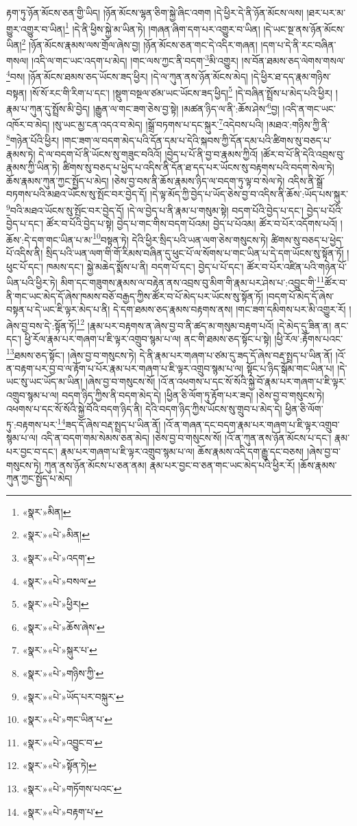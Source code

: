 རྟག་ཏུ་ཉོན་མོངས་ཅན་གྱི་ཡིད། །ཉོན་མོངས་ལྷན་ཅིག་སྐྱེ་ཞིང་འགག །དེ་ཕྱིར་དེ་ནི་ཉོན་མོངས་ལས། །ཐར་པར་མ་གྱུར་འགྱུར་བ་ཡིན།\footnote{«སྣར་»མིན།} །དེ་ནི་ཕྱིས་སྐྱེ་མ་ཡིན་ཏེ། །གཞན་ཞིག་དག་པར་འགྱུར་བ་ཡིན། །དེ་ཡང་སྔ་ནས་ཉོན་མོངས་ཡིན།\footnote{«སྣར་»«པེ་»མིན།} །ཉོན་མོངས་རྣམས་ལས་གྲོལ་ཞེས་བྱ། །ཉོན་མོངས་ཅན་གང་དེ་འདིར་གཞན། །དག་པ་དེ་ནི་རང་བཞིན་གསལ། །འདི་ལ་གང་ཡང་འདག་པ་མེད། །གང་ལས་ཀྱང་ནི་བདག་\footnote{«སྣར་»«པེ་»འདག་}མི་འགྱུར། །ས་བོན་ཐམས་ཅད་ལེགས་གསལ་\footnote{«སྣར་»«པེ་»བསལ་}བས། །ཉོན་མོངས་ཐམས་ཅད་ཡོངས་ཟད་ཕྱིར། །དེ་ལ་ཀུན་ནས་ཉོན་མོངས་མེད། །དེ་ཕྱིར་ཐ་དད་རྣམ་གཉིས་བསྟན། །སོ་སོ་རང་གི་རིག་པ་དང་། །སྡུག་བསྔལ་ཙམ་ཡང་ཡོངས་ཟད་ཕྱིད།\footnote{«སྣར་»«པེ་»ཕྱིར།} །དེ་བཞིན་སྤྲོས་པ་མེད་པའི་ཕྱིར། །རྣམ་པ་ཀུན་དུ་སྤྲོས་མི་བྱེད། །རྒྱུན་ལ་གང་ཟག་ཅེས་བྱ་སྟེ། །མཚན་ཉིད་ལ་ནི་:ཆོས་ཤེས་\footnote{«སྣར་»«པེ་»ཆོས་ཞེས་}བྱ། །འདི་ན་གང་ཡང་འཁོར་བ་མེད། །སུ་ཡང་མྱ་ངན་འདའ་བ་མེད། །སྒྲོ་བཏགས་པ་དང་སྐུར་\footnote{«སྣར་»«པེ་»སྐུར་པ་}འདེབས་པའི། །མཐའ་:གཉིས་ཀྱི་ནི་\footnote{«སྣར་»«པེ་»གཉིས་ཀྱི་}གཉེན་པོའི་ཕྱིར། །གང་ཟག་ལ་བདག་མེད་པའི་དོན་དམ་པ་དེའི་སྐབས་ཀྱི་དོན་དམ་པའི་ཚིགས་སུ་བཅད་པ་རྣམས་ཏེ། དེ་ལ་བདག་པོ་ནི་ཡོངས་སུ་གཟུང་བའིའོ། །བྱེད་པ་པོ་ནི་བྱ་བ་རྣམས་ཀྱིའོ། །ཚོར་བ་པོ་ནི་དེའི་འབྲས་བུ་རྣམས་ཀྱི་ཡིན་ཏེ། ཚིགས་སུ་བཅད་པ་ཕྱེད་པ་འདིས་ནི་དོན་ཐ་དད་པར་ཡོངས་སུ་བརྟགས་པའི་བདག་སེལ་ཏེ། ཆོས་རྣམས་ཀུན་ཀྱང་སྤྱོད་པ་མེད། །ཅེས་བྱ་བས་ནི་ཆོས་རྣམས་ཉིད་ལ་བདག་ཏུ་ལྟ་བ་སེལ་ཏེ། འདིས་ནི་སྒྲོ་བཏགས་པའི་མཐའ་ཡོངས་སུ་སྤོང་བར་བྱེད་དོ། །དེ་ལྟ་མོད་ཀྱི་བྱེད་པ་ཡོད་ཅེས་བྱ་བ་འདིས་ནི་ཆོས་:ཡོད་པས་སྐུར་\footnote{«སྣར་»«པེ་»ཡོད་པར་བསྐུར་}བའི་མཐའ་ཡོངས་སུ་སྤོང་བར་བྱེད་དོ། །དེ་ལ་བྱེད་པ་ནི་རྣམ་པ་གསུམ་སྟེ། བདག་པོའི་བྱེད་པ་དང་། བྱེད་པ་པོའི་བྱེད་པ་དང་། ཚོར་བ་པོའི་བྱེད་པ་སྟེ། བྱེད་པ་གང་གིས་བདག་པོའམ། བྱེད་པ་པོའམ། ཚོར་བ་པོར་འདོགས་པའོ། །ཆོས་:དེ་དག་གང་ཡིན་པ་མ་\footnote{«སྣར་»«པེ་»གང་ཡིན་པ་}བསྟན་ཏེ། དེའི་ཕྱིར་སྲིད་པའི་ཡན་ལག་ཅེས་གསུངས་ཏེ། ཚིགས་སུ་བཅད་པ་ཕྱེད་པོ་འདིས་ནི། སྲིད་པའི་ཡན་ལག་གི་གོ་རིམས་བཞིན་དུ་ཕུང་པོ་ལ་སོགས་པ་གང་ཡིན་པ་དེ་དག་ཡོངས་སུ་སྟོན་ཏོ། །ཕུང་པོ་དང་། ཁམས་དང་། སྐྱེ་མཆེད་སྨོས་པ་ནི། བདག་པོ་དང་། བྱེད་པ་པོ་དང་། ཚོར་བ་པོར་འཛིན་པའི་གཉེན་པོ་ཡིན་པའི་ཕྱིར་ཏེ། མིག་དང་གཟུགས་རྣམས་ལ་བརྟེན་ནས་འབྲས་བུ་མིག་གི་རྣམ་པར་ཤེས་པ་:འབྱུང་གི་\footnote{«སྣར་»«པེ་»འབྱུང་བ་}ཚོར་བ་ནི་གང་ཡང་མེད་དོ་ཞེས་ཁམས་བཅོ་བརྒྱད་ཀྱིས་ཚོར་བ་པོ་མེད་པར་ཡོངས་སུ་སྟོན་ཏོ། །བདག་པོ་མེད་དོ་ཞེས་བསྟན་པ་དེ་ཡང་ཇི་ལྟར་མེད་པ་ནི། དེ་དག་ཐམས་ཅད་རྣམས་བརྟགས་ནས། །གང་ཟག་དམིགས་པར་མི་འགྱུར་རོ། །ཞེས་བྱ་བས་དེ་:སྟོན་ཏོ།\footnote{«སྣར་»«པེ་»སྟོན་ཏེ།} །རྣམ་པར་བརྟགས་ན་ཞེས་བྱ་བ་ནི་ཚད་མ་གསུམ་བརྟག་པའོ། །དེ་མེད་དུ་ཟིན་ན། ནང་དང་། ཕྱི་རོལ་རྣམ་པར་གཞག་པ་ཇི་ལྟར་འགྲུབ་སྙམ་པ་ལ། ནང་གི་ཐམས་ཅད་སྟོང་པ་སྟེ། །ཕྱི་རོལ་:རྟོགས་པའང་\footnote{«སྣར་»«པེ་»གཏོགས་པའང་}ཐམས་ཅད་སྟོང་། །ཞེས་བྱ་བ་གསུངས་ཏེ། དེ་ནི་རྣམ་པར་གཞག་པ་ཙམ་དུ་ཟད་དོ་ཞེས་བརྡ་སྤྲད་པ་ཡིན་ནོ། །འོ་ན་བརྟག་པར་བྱ་བ་ལ་རྟོག་པ་པོར་རྣམ་པར་གཞག་པ་ཇི་ལྟར་འགྲུབ་སྙམ་པ་ལ། སྟོང་པ་ཉིད་སྒོམ་གང་ཡིན་པ། །དེ་ཡང་སུ་ཡང་ཡོད་མ་ཡིན། །ཞེས་བྱ་བ་གསུངས་སོ། །འོ་ན་འཕགས་པ་དང་སོ་སོའི་སྐྱེ་བོ་རྣམ་པར་གཞག་པ་ཇི་ལྟར་འགྲུབ་སྙམ་པ་ལ། བདག་ཉིད་ཀྱིས་ནི་བདག་མེད་དེ། །ཕྱིན་ཅི་ལོག་ཏུ་རྟོག་པར་ཟད། །ཅེས་བྱ་བ་གསུངས་ཏེ། འཕགས་པ་དང་སོ་སོའི་སྐྱེ་བོའི་བདག་ཉིད་ནི། དེའི་བདག་ཉིད་ཀྱིས་ཡོངས་སུ་གྲུབ་པ་མེད་དེ། ཕྱིན་ཅི་ལོག་ཏུ་:བརྟགས་པར་\footnote{«སྣར་»«པེ་»བརྟག་པ་}ཟད་དོ་ཞེས་བརྡ་སྤྲད་པ་ཡིན་ནོ། །འོ་ན་གཞན་དང་བདག་རྣམ་པར་གཞག་པ་ཇི་ལྟར་འགྲུབ་སྙམ་པ་ལ། འདི་ན་བདག་གམ་སེམས་ཅན་མེད། །ཅེས་བྱ་བ་གསུངས་སོ། །འོ་ན་ཀུན་ནས་ཉོན་མོངས་པ་དང་། རྣམ་པར་བྱང་བ་དང་། རྣམ་པར་གཞག་པ་ཇི་ལྟར་འགྲུབ་སྙམ་པ་ལ། ཆོས་རྣམས་འདི་དག་རྒྱུ་དང་བཅས། །ཞེས་བྱ་བ་གསུངས་ཏེ། ཀུན་ནས་ཉོན་མོངས་པ་ཅན་ནམ། རྣམ་པར་བྱང་བ་ཅན་གང་ཡང་མེད་པའི་ཕྱིར་རོ། །ཆོས་རྣམས་ཀུན་ཀྱང་སྤྱོད་པ་མེད། 